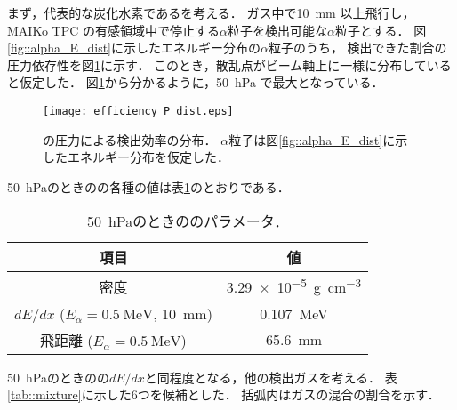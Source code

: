 \documentclass[../master]{subfiles}
\begin{document}
まず，代表的な炭化水素である\Methane を考える．
ガス中で\SI{10}{\milli\metre} 以上飛行し，MAIKo TPC の有感領域中で停止する$\alpha$粒子を検出可能な$\alpha$粒子とする．
図\ref{fig::alpha_E_dist}に示したエネルギー分布の$\alpha$粒子のうち，
検出できた割合の圧力依存性を図\ref{fig::efficiency_P_dist}に示す．
このとき，散乱点がビーム軸上に一様に分布していると仮定した．
図\ref{fig::efficiency_P_dist}から分かるように，\SI{50}{\hecto\pascal} で最大となっている．
\begin{figure}
  \centering
  \texttt{[image: efficiency\_P\_dist.eps]}
  \caption[\Methane の圧力による検出効率の分布．]
          {\Methane の圧力による検出効率の分布．
            $\alpha$粒子は図\ref{fig::alpha_E_dist}に示したエネルギー分布を仮定した．
           }
  \label{fig::efficiency_P_dist}
\end{figure}
\SI{50}{\hecto\pascal}のときの\Methane の各種の値は表\ref{tab::CH4_50_params}のとおりである．
\begin{table}
  \centering
  \caption{\SI{50}{\hecto\pascal}のときの\Methane のパラメータ．}
  \label{tab::CH4_50_params}
  \begin{tabular}{cc}
    \toprule
    項目 & 値\\
    \midrule
    密度 & \SI{3.29e-5}{\gram\per\cubic\centi\metre} \\
    $dE/dx$ ($E_{\alpha} = \SI{0.5}{\mega\electronvolt}$, \SI{10}{\milli\metre}) & \SI{0.107}{\mega\electronvolt}\\
    飛距離 ($E_{\alpha} = \SI{0.5}{\mega\electronvolt}$) & \SI{65.6}{\milli\metre} \\
    \bottomrule
  \end{tabular}
\end{table}
\SI{50}{\hecto\pascal}のときの\Methane の$dE/dx$と同程度となる，他の検出ガスを考える．
表\ref{tab::mixture}に示した6つを候補とした．
括弧内はガスの混合の割合を示す．
\end{document}
